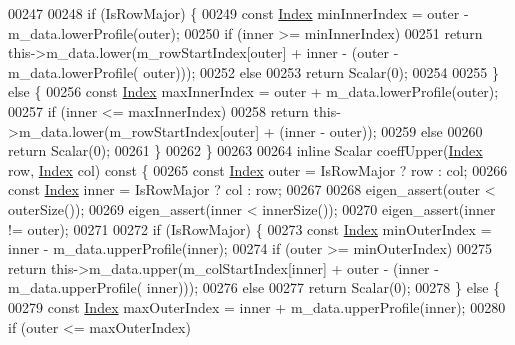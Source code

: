\begin{DoxyCode}
00247 
00248         \textcolor{keywordflow}{if} (IsRowMajor) \{
00249             \textcolor{keyword}{const} \hyperlink{namespace_eigen_a62e77e0933482dafde8fe197d9a2cfde}{Index} minInnerIndex = outer - m\_data.lowerProfile(outer);
00250             \textcolor{keywordflow}{if} (inner >= minInnerIndex)
00251                 \textcolor{keywordflow}{return} this->m\_data.lower(m\_rowStartIndex[outer] + inner - (outer - m\_data.lowerProfile(
      outer)));
00252             \textcolor{keywordflow}{else}
00253                 \textcolor{keywordflow}{return} Scalar(0);
00254 
00255         \} \textcolor{keywordflow}{else} \{
00256             \textcolor{keyword}{const} \hyperlink{namespace_eigen_a62e77e0933482dafde8fe197d9a2cfde}{Index} maxInnerIndex = outer + m\_data.lowerProfile(outer);
00257             \textcolor{keywordflow}{if} (inner <= maxInnerIndex)
00258                 \textcolor{keywordflow}{return} this->m\_data.lower(m\_rowStartIndex[outer] + (inner - outer));
00259             \textcolor{keywordflow}{else}
00260                 \textcolor{keywordflow}{return} Scalar(0);
00261         \}
00262     \}
00263 
00264     \textcolor{keyword}{inline} Scalar coeffUpper(\hyperlink{namespace_eigen_a62e77e0933482dafde8fe197d9a2cfde}{Index} row, \hyperlink{namespace_eigen_a62e77e0933482dafde8fe197d9a2cfde}{Index} col)\textcolor{keyword}{ const }\{
00265         \textcolor{keyword}{const} \hyperlink{namespace_eigen_a62e77e0933482dafde8fe197d9a2cfde}{Index} outer = IsRowMajor ? row : col;
00266         \textcolor{keyword}{const} \hyperlink{namespace_eigen_a62e77e0933482dafde8fe197d9a2cfde}{Index} inner = IsRowMajor ? col : row;
00267 
00268         eigen\_assert(outer < outerSize());
00269         eigen\_assert(inner < innerSize());
00270         eigen\_assert(inner != outer);
00271 
00272         \textcolor{keywordflow}{if} (IsRowMajor) \{
00273             \textcolor{keyword}{const} \hyperlink{namespace_eigen_a62e77e0933482dafde8fe197d9a2cfde}{Index} minOuterIndex = inner - m\_data.upperProfile(inner);
00274             \textcolor{keywordflow}{if} (outer >= minOuterIndex)
00275                 \textcolor{keywordflow}{return} this->m\_data.upper(m\_colStartIndex[inner] + outer - (inner - m\_data.upperProfile(
      inner)));
00276             \textcolor{keywordflow}{else}
00277                 \textcolor{keywordflow}{return} Scalar(0);
00278         \} \textcolor{keywordflow}{else} \{
00279             \textcolor{keyword}{const} \hyperlink{namespace_eigen_a62e77e0933482dafde8fe197d9a2cfde}{Index} maxOuterIndex = inner + m\_data.upperProfile(inner);
00280             \textcolor{keywordflow}{if} (outer <= maxOuterIndex)

\end{DoxyCode}
